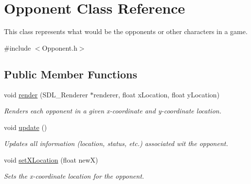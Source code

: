 \hypertarget{class_opponent}{}\section{Opponent Class Reference}
\label{class_opponent}


This class represents what would be the opponents or other characters in a game.  




{\ttfamily \#include $<$Opponent.\+h$>$}

\subsection*{Public Member Functions}
\begin{DoxyCompactItemize}
\item 
\mbox{\label{class_opponent_ac93281c163a0a7e4767f25b96e3820c3}} 
void \mbox{\hyperlink{class_opponent_ac93281c163a0a7e4767f25b96e3820c3}{render}} (S\+D\+L\+\_\+\+Renderer $\ast$renderer, float x\+Location, float y\+Location)
\begin{DoxyCompactList}\small\item\em Renders each opponent in a given x-\/coordinate and y-\/coordinate location. \end{DoxyCompactList}\item 
\mbox{\label{class_opponent_a587e07a61712e5ebddaa8e1d6fc75c40}} 
void \mbox{\hyperlink{class_opponent_a587e07a61712e5ebddaa8e1d6fc75c40}{update}} ()
\begin{DoxyCompactList}\small\item\em Updates all information (location, status, etc.) associated wit the opponent. \end{DoxyCompactList}\item 
\mbox{\label{class_opponent_a1dae0032293c8f902aeda50e181ebc11}} 
void \mbox{\hyperlink{class_opponent_a1dae0032293c8f902aeda50e181ebc11}{set\+X\+Location}} (float newX)
\begin{DoxyCompactList}\small\item\em Sets the x-\/coordinate location for the opponent. \end{DoxyCompactList}\item 
\mbox{\label{class_opponent_a11e1ae439fff02f56d9de8bfe1e972bb}} 

\end{DoxyCompactItemize}
